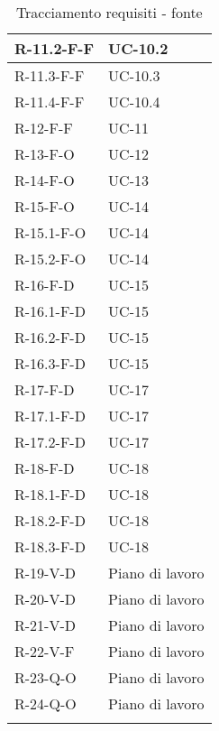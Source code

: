 \begin{longtable}{| C{6cm} |C{6cm}|}
    R-11.2-F-F         & UC-10.2         \\\hline
    R-11.3-F-F         & UC-10.3         \\\hline
    R-11.4-F-F         & UC-10.4         \\\hline
    R-12-F-F           & UC-11           \\\hline
    R-13-F-O           & UC-12           \\\hline
    R-14-F-O           & UC-13           \\\hline
    R-15-F-O           & UC-14           \\\hline
    R-15.1-F-O         & UC-14           \\\hline
    R-15.2-F-O         & UC-14           \\\hline
    R-16-F-D           & UC-15           \\\hline
    R-16.1-F-D         & UC-15           \\\hline
    R-16.2-F-D         & UC-15           \\\hline
    R-16.3-F-D         & UC-15           \\\hline
    R-17-F-D           & UC-17           \\\hline
    R-17.1-F-D         & UC-17           \\\hline
    R-17.2-F-D         & UC-17           \\\hline
    R-18-F-D           & UC-18           \\\hline
    R-18.1-F-D         & UC-18           \\\hline
    R-18.2-F-D         & UC-18           \\\hline
    R-18.3-F-D         & UC-18           \\\hline
    R-19-V-D            & Piano di lavoro \\\hline
    R-20-V-D            & Piano di lavoro \\\hline
    R-21-V-D            & Piano di lavoro \\\hline
    R-22-V-F            & Piano di lavoro \\\hline
    R-23-Q-O            & Piano di lavoro \\\hline
    R-24-Q-O            & Piano di lavoro \\\hline
    \caption{Tracciamento requisiti - fonte}
\end{longtable}
